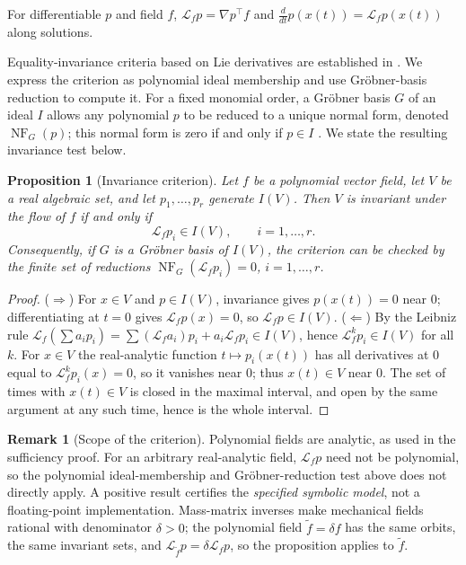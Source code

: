 \documentclass[10pt]{article}
\newtheorem{proposition}{Proposition}
\theoremstyle{definition}
\newtheorem{remark}{Remark}
\DeclareMathOperator{\NF}{NF}
\newcommand{\Lie}{\mathcal{L}}
\begin{document}
For differentiable $p$ and field $f$, $\Lie_fp=\nabla p^\top f$ and
$\frac{d}{dt}p(x(t))=\Lie_fp(x(t))$ along solutions.

Equality-invariance criteria based on Lie derivatives are established in
\citet{ghorbal2014}. We express the criterion as polynomial ideal membership
and use Gr\"obner-basis reduction to compute it. For a fixed monomial order,
a Gr\"obner basis $G$ of an ideal $I$ allows any polynomial $p$ to be reduced
to a unique normal form, denoted $\NF_G(p)$; this normal form is zero if and
only if $p\in I$ \citep{cox2015}. We state the resulting invariance test below.

\begin{proposition}[Invariance criterion]\label{prop:invariance}
Let $f$ be a polynomial vector field, let
$V$ be a real algebraic set, and let $p_1,\dots,p_r$ generate $I(V)$. Then
$V$ is invariant under the flow of $f$ if and only if
\begin{equation}\label{eq:lie-ideal}
  \Lie_f p_i\in I(V),\qquad i=1,\dots,r.
\end{equation}
Consequently, if $G$ is a Gr\"obner basis of $I(V)$, the criterion can be
checked by the finite set of reductions $\NF_G(\Lie_fp_i)=0$,
$i=1,\dots,r$.
\end{proposition}

\begin{proof}
($\Rightarrow$) For $x\in V$ and $p\in I(V)$, invariance gives
$p(x(t))=0$ near $0$; differentiating at $t=0$ gives $\Lie_fp(x)=0$, so
$\Lie_fp\in I(V)$.
($\Leftarrow$) By the Leibniz rule
$\Lie_f(\sum a_ip_i)=\sum(\Lie_fa_i)p_i+a_i\Lie_fp_i\in I(V)$, hence
$\Lie_f^kp_i\in I(V)$ for all $k$. For $x\in V$ the real-analytic function
$t\mapsto p_i(x(t))$ has all derivatives at $0$ equal to
$\Lie_f^kp_i(x)=0$, so it vanishes near $0$; thus $x(t)\in V$ near $0$. The
set of times with $x(t)\in V$ is closed in the maximal interval, and open by
the same argument at any such time, hence is the whole interval.
\end{proof}

\begin{remark}[Scope of the criterion]
Polynomial fields are analytic, as used in the sufficiency proof. For an
arbitrary real-analytic field, $\Lie_fp$ need not be polynomial, so the
polynomial ideal-membership and Gr\"obner-reduction test above does not
directly apply. A positive result certifies the \emph{specified symbolic
model}, not a floating-point implementation. Mass-matrix inverses make
mechanical fields rational with denominator $\delta>0$; the polynomial field
$\tilde f=\delta f$ has the same orbits, the same invariant sets, and
$\Lie_{\tilde f}p=\delta\Lie_fp$, so the proposition applies to $\tilde f$.
\end{remark}
\end{document}
